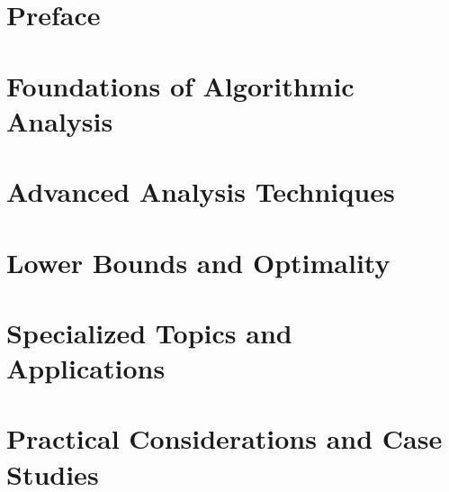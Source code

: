 \documentclass[12pt, oneside, openany]{book}
\begin{document}
\part{Preface}
\part{Foundations of Algorithmic Analysis}
\part{Advanced Analysis Techniques}
\part{Lower Bounds and Optimality}
\part{Specialized Topics and Applications}
\part{Practical Considerations and Case Studies}
\end{document}
